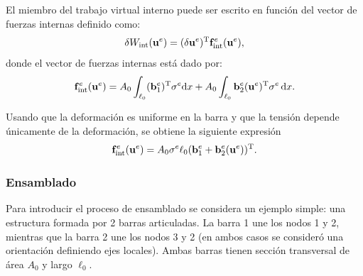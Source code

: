 El miembro del trabajo virtual interno puede ser escrito en función del vector de fuerzas internas definido como:
%
\begin{equation}
\delta  W_{\text{int}}({\bf u}^e) = (\delta  {\bf u}^e)^{\text{T}} {\bf f}_{\text{int}}^e({\bf u}^e),
\end{equation}
%
donde el vector de fuerzas internas está dado por:
%
\begin{equation}
{\bf f}_{\text{int}}^e({\bf u}^e) = A_0 \int_{\ell_0}  ({\bf b}_1^e)^{\text{T}} \sigma^e {\text{d}} x + A_0 \int_{\ell_0}  {\bf b}_{2}^e({\bf u}^e)^{\text{T}} \sigma^e  \, {\text{d}} x .
\end{equation}

Usando que la deformación es uniforme en la barra y que la tensión depende únicamente de la deformación, se obtiene la siguiente expresión 
%
\begin{equation}
\bff_{\text{int}}^e(\bfu^e) %
%
= A_0 \sigma^e  \ell_0  (\bfb_1^e +  \bfb_{2}^e(\bfu^e) )^{\text{T}}.
\end{equation}


%

\subsubsection{Ensamblado} \label{sec:ensamblado}

Para introducir el proceso de ensamblado se considera un ejemplo simple: una estructura formada por 2 barras articuladas. %
%
La barra 1 une los nodos 1 y 2, mientras que la barra 2 une los nodos 3 y 2 (en ambos casos se consideró una orientación definiendo ejes locales). %
%
Ambas barras tienen sección transversal de área $A_0$ y largo $\ell_0$. %


